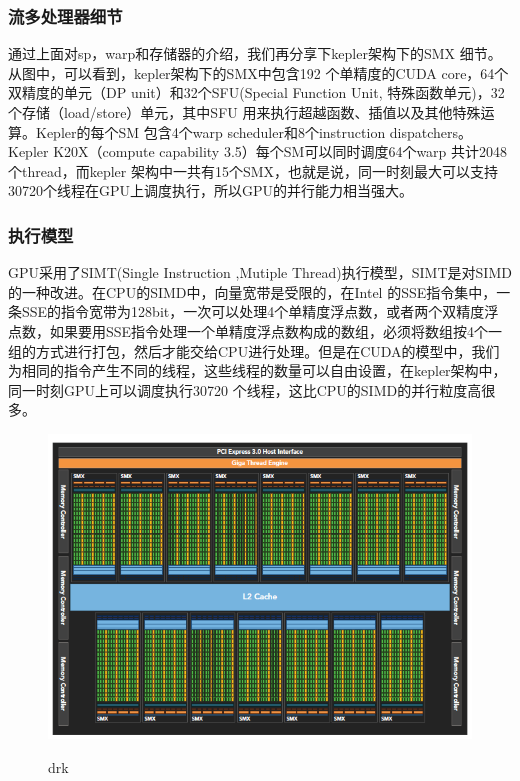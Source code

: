 \subsubsection{流多处理器细节}
通过上面对sp，warp和存储器的介绍，我们再分享下kepler架构下的SMX 细节。从图中，可以看到，kepler架构下的SMX中包含192 个单精度的CUDA core，64个双精度的单元（DP unit）和32个SFU(Special Function Unit, 特殊函数单元)，32个存储（load/store）单元，其中SFU 用来执行超越函数、插值以及其他特殊运算。Kepler的每个SM 包含4个warp scheduler和8个instruction dispatchers。 Kepler K20X（compute capability 3.5）每个SM可以同时调度64个warp 共计2048个thread，而kepler 架构中一共有15个SMX，也就是说，同一时刻最大可以支持30720个线程在GPU上调度执行，所以GPU的并行能力相当强大。\newline
\subsubsection{执行模型}
GPU采用了SIMT(Single Instruction ,Mutiple Thread)执行模型，SIMT是对SIMD的一种改进。在CPU的SIMD中，向量宽带是受限的，在Intel 的SSE指令集中，一条SSE的指令宽带为128bit，一次可以处理4个单精度浮点数，或者两个双精度浮点数，如果要用SSE指令处理一个单精度浮点数构成的数组，必须将数组按4个一组的方式进行打包，然后才能交给CPU进行处理。但是在CUDA的模型中，我们为相同的指令产生不同的线程，这些线程的数量可以自由设置，在kepler架构中，同一时刻GPU上可以调度执行30720 个线程，这比CPU的SIMD的并行粒度高很多。\newline
\begin{figure}
\setlength{\belowcaptionskip}{-0.5cm}
  \begin{center}
    {\includegraphics[width=1 \textwidth]{figures/arc.png}}
    \end{center}
  \caption{{\footnotesize{drk}}}
  \label{drk}
\end{figure}
